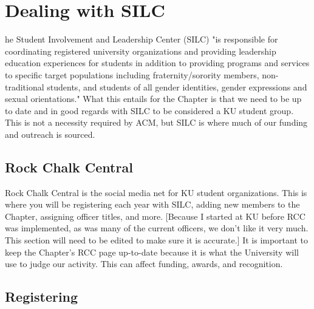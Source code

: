 %
%
\let\textcircled=\pgftextcircled
\chapter{Dealing with SILC}
\label{chap:silc}

he Student Involvement and Leadership Center (SILC) "is responsible for coordinating registered university organizations and providing leadership education experiences for students in addition to providing programs and services to specific target populations including fraternity/sorority members, non-traditional students, and students of all gender identities, gender expressions and sexual orientations." What this entails for the Chapter is that we need to be up to date and in good regards with SILC to be considered a KU student group. This is not a necessity required by ACM, but SILC is where much of our funding and outreach is sourced. 


\section{Rock Chalk Central}
\label{sec:sec01}

Rock Chalk Central is the social media net for KU student organizations. This is where you will be registering each year with SILC, adding new members to the Chapter, assigning officer titles, and more. [Because I started at KU before RCC was implemented, as was many of the current officers, we don't like it very much. This section will need to be edited to make sure it is accurate.] It is important to keep the Chapter's RCC page up-to-date because it is what the University will use to judge our activity. This can affect funding, awards, and recognition.

\section{Registering}
\label{sec:sec02}

